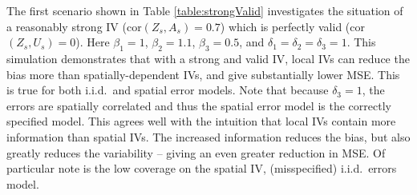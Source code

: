 \documentclass[12pt]{article}
\begin{document}
The first scenario shown in Table \ref{table:strongValid} investigates the situation of a reasonably strong IV (cor$(Z_s,A_s) = 0.7$) which is perfectly valid (cor$(Z_s,U_s) = 0$). Here $\beta_1 = 1$, $\beta_2=1.1$, $\beta_3 = 0.5$, and $\delta_1 = \delta_2 = \delta_3 = 1$. This simulation demonstrates that with a strong and valid IV, local IVs can reduce the bias more than spatially-dependent IVs, and give substantially lower MSE. This is true for both i.i.d.~and spatial error models.  Note that because $\delta_3 =1$, the errors are spatially correlated and thus the spatial error model is the correctly specified model. This agrees well with the intuition that local IVs contain more information than spatial IVs. The increased information reduces the bias, but also greatly reduces the variability -- giving an even greater reduction in MSE. Of particular note is the low coverage on the spatial IV, (misspecified) i.i.d.~errors model.
\end{document}
